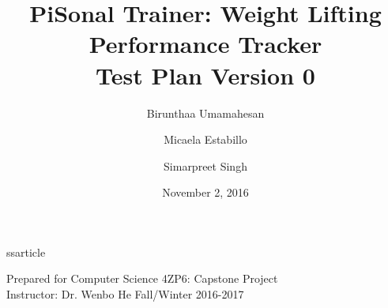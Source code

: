 ss{article}
\usepackage[utf8]{inputenc}
\usepackage[letterpaper, portrait, margin=1in]{geometry}
\usepackage{enumerate}
\setcounter{tocdepth}{3}
\usepackage{caption}
\usepackage{graphicx}
\graphicspath{ {images/} }
\usepackage{array}
\usepackage{mdframed}
\usepackage{fancyhdr}
\pagestyle{fancy}
\fancyhf{}
\fancyfoot[R]{\thepage}
\renewcommand{\headrulewidth}{0.4pt}
\renewcommand{\footrulewidth}{0.4pt}

\usepackage{array}
\setlength\extrarowheight{6pt}

\newcommand\tab{\hspace*{2cm}}

\newenvironment{testcase}
    {
    \begin{center}
    \begin{mdframed}[
        userdefinedwidth=15.5cm,
        leftmargin=1cm,
        rightmargin=1cm
        ]
    \begin{tabular}{p{2.5cm} p{9cm}}
    }
    {
    \end{tabular}
    \end{mdframed}
    \end{center}
    }

\newcommand{\tctit}[2]{\textbf{#1} & \textbf{#2}}
\newcommand{\tcdesc}{\textbf{Description:}}
\newcommand{\tctype}{\textbf{Type:}}
\newcommand{\testers}{\textbf{Tester(s):}}
\newcommand{\tcinit}{\textbf{Initial State:}}
\newcommand{\tcin}{\textbf{Input:}}
\newcommand{\tcout}{\textbf{Output:}}
\newcommand{\tcpass}{\textbf{Pass:}}
\title{
PiSonal Trainer: Weight Lifting Performance Tracker\\
\Large {Test Plan Version 0}
}
\date{November 2, 2016}
\author{Birunthaa Umamahesan \and Micaela Estabillo \and Simarpreet Singh}


\maketitle
\thispagestyle{empty}
\vfill
\begin{center}
    Prepared for Computer Science 4ZP6: Capstone Project \\
    Instructor: Dr. Wenbo He
    Fall/Winter 2016-2017\\
\end{center}
\newpage

